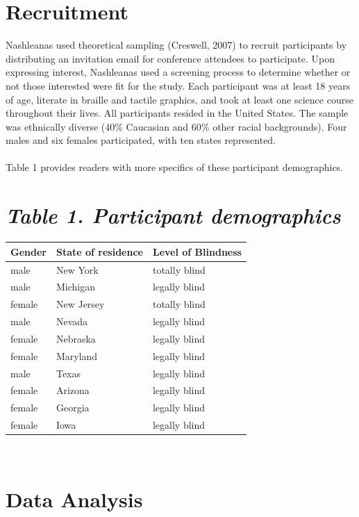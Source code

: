 \documentclass[11.5pt]{sig-alternate}
\begin{document}
\begin{large}
\section*{Recruitment}
Nashleanas used theoretical sampling (Creswell, 2007) to recruit participants by distributing an invitation email for conference attendees to participate. Upon expressing interest, Nashleanas used a screening process to determine whether or not those interested were fit for the study. Each participant was at least 18 years of age, literate in braille and tactile graphics, and took at least one science course throughout their lives. All participants resided in the United States. The sample was ethnically diverse (40\% Caucasian and 60\% other racial backgrounds). Four males and six females participated, with ten states represented. 
\\
\\Table 1 provides readers with more specifics of these participant demographics.\\
\section*{\textit{ Table 1. Participant demographics}}

\begin{tabular}{ | m{3em} | m{3cm}| m{3cm}|}
 \hline
Gender & State of \newline residence & Level of \newline Blindness \\ 
 \hline
 male & New York & totally blind \\ 
 \hline
 male & Michigan & legally blind \\ 
 \hline
 female & New Jersey & totally blind \\ 
 \hline
 male & Nevada & legally blind \\ 
 \hline
female & Nebraska & legally blind \\ 
 \hline
female & Maryland & legally blind \\ 
 \hline
 male & Texas & legally blind \\ 
 \hline
 female & Arizona & legally blind \\ 
 \hline
 female & Georgia & legally blind \\ 
 \hline
female & Iowa & legally blind \\ 
\hline
\end{tabular}\\

\section*{Data Analysis}


\end{large}
\end{document}
